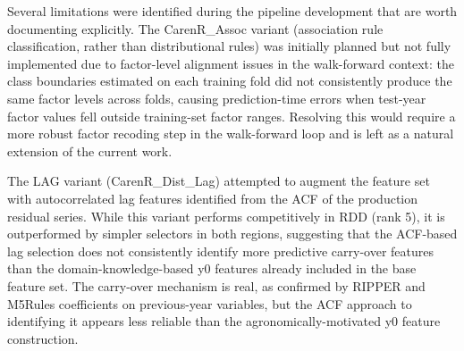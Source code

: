 Several limitations were identified during the pipeline development that are worth documenting explicitly. The CarenR\_Assoc variant (association rule classification, rather than distributional rules) was initially planned but not fully implemented due to factor-level alignment issues in the walk-forward context: the class boundaries estimated on each training fold did not consistently produce the same factor levels across folds, causing prediction-time errors when test-year factor values fell outside training-set factor ranges. Resolving this would require a more robust factor recoding step in the walk-forward loop and is left as a natural extension of the current work.

The LAG variant (CarenR\_Dist\_Lag) attempted to augment the feature set with autocorrelated lag features identified from the ACF of the production residual series. While this variant performs competitively in RDD (rank 5), it is outperformed by simpler selectors in both regions, suggesting that the ACF-based lag selection does not consistently identify more predictive carry-over features than the domain-knowledge-based y0 features already included in the base feature set. The carry-over mechanism is real, as confirmed by RIPPER and M5Rules coefficients on previous-year variables, but the ACF approach to identifying it appears less reliable than the agronomically-motivated y0 feature construction.
